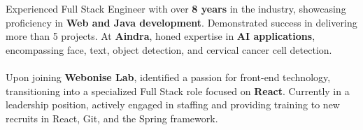 \documentclass[10pt,a4paper,ragged2e,withhyper]{altacv}
\begin{document}
\begin{paracol}{2}







\switchcolumn

Experienced Full Stack Engineer with over \textbf{8 years} in the industry, showcasing proficiency in \textbf{Web and Java development}. Demonstrated success in delivering more than 5 projects. At \textbf{Aindra}, honed expertise in \textbf{AI applications}, encompassing face, text, object detection, and cervical cancer cell detection.\\~\\


Upon joining \textbf{Webonise Lab}, identified a passion for front-end technology, transitioning into a specialized Full Stack role focused on \textbf{React}. Currently in a leadership position, actively engaged in staffing and providing training to new recruits in React, Git, and the Spring framework.


\end{paracol}
\end{document}
